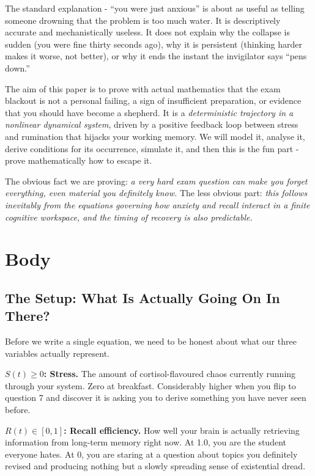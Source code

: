 \documentclass[11pt,a4paper]{article}
\begin{document}
The standard explanation - ``you were just anxious'' is about as
useful as telling someone drowning that the problem is too much water.
It is descriptively accurate and mechanistically useless. It does not
explain why the collapse is sudden (you were fine thirty seconds ago),
why it is persistent (thinking harder makes it worse, not better), or
why it ends the instant the invigilator says ``pens down.''

The aim of this paper is to prove with actual mathematics that the
exam blackout is not a personal failing, a sign of insufficient
preparation, or evidence that you should have become a shepherd. It is
a \emph{deterministic trajectory in a nonlinear dynamical system},
driven by a positive feedback loop between stress and rumination that
hijacks your working memory. We will model it, analyse it, derive
conditions for its occurrence, simulate it, and then this is the fun
part - prove mathematically how to escape it.

The obvious fact we are proving: \emph{a very hard exam question can
make you forget everything, even material you definitely know.} The
less obvious part: \emph{this follows inevitably from the equations
governing how anxiety and recall interact in a finite cognitive
workspace, and the timing of recovery is also predictable.}

\section{Body}

\subsection{The Setup: What Is Actually Going On In There?}

Before we write a single equation, we need to be honest about what
our three variables actually represent.

\textbf{$S(t) \geq 0$: Stress.} The amount of cortisol-flavoured
chaos currently running through your system. Zero at breakfast.
Considerably higher when you flip to question 7 and discover it is
asking you to derive something you have never seen before.

\textbf{$R(t) \in [0,1]$: Recall efficiency.} How well your brain
is actually retrieving information from long-term memory right now.
At 1.0, you are the student everyone hates. At 0, you are staring
at a question about topics you definitely revised and producing
nothing but a slowly spreading sense of existential dread.
\end{document}
